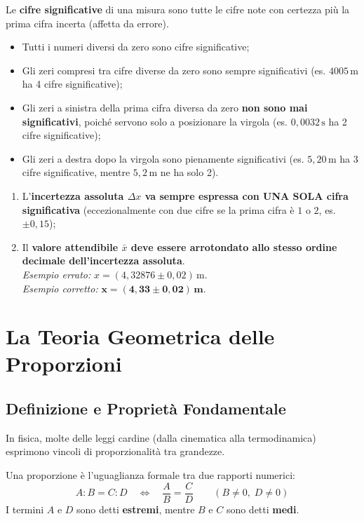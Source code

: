 \documentclass[11pt,a4paper,oneside]{report}
\begin{document}
\begin{definizione}
Le \textbf{cifre significative} di una misura sono tutte le cifre note con certezza più la prima cifra incerta (affetta da errore).
\begin{itemize}
  \item Tutti i numeri diversi da zero sono cifre significative;
  \item Gli zeri compresi tra cifre diverse da zero sono sempre significativi (es. $4005\,\text{m}$ ha 4 cifre significative);
  \item Gli zeri a sinistra della prima cifra diversa da zero \textbf{non sono mai significativi}, poiché servono solo a posizionare la virgola (es. $0{,}0032\,\text{s}$ ha 2 cifre significative);
  \item Gli zeri a destra dopo la virgola sono pienamente significativi (es. $5{,}20\,\text{m}$ ha 3 cifre significative, mentre $5{,}2\,\text{m}$ ne ha solo 2).
\end{itemize}
\end{definizione}

\begin{avviso}
\begin{enumerate}
  \item L'\textbf{incertezza assoluta $\Delta x$ va sempre espressa con UNA SOLA cifra significativa} (eccezionalmente con due cifre se la prima cifra è $1$ o $2$, es. $\pm 0{,}15$);
  \item Il \textbf{valore attendibile $\bar{x}$ deve essere arrotondato allo stesso ordine decimale dell'incertezza assoluta}.\\
  \textit{Esempio errato:} $x = (4{,}32876 \pm 0{,}02)\,\text{m}$.\\
  \textit{Esempio corretto:} $\mathbf{x = (4{,}33 \pm 0{,}02)\,\text{m}}$.
\end{enumerate}
\end{avviso}

\chapter{La Teoria Geometrica delle Proporzioni}

\section{Definizione e Proprietà Fondamentale}
In fisica, molte delle leggi cardine (dalla cinematica alla termodinamica) esprimono vincoli di proporzionalità tra grandezze.
\begin{definizione}
Una proporzione è l'uguaglianza formale tra due rapporti numerici:
\[
A : B = C : D \quad \Longleftrightarrow \quad \frac{A}{B} = \frac{C}{D} \qquad (B \neq 0, \; D \neq 0)
\]
I termini $A$ e $D$ sono detti \textbf{estremi}, mentre $B$ e $C$ sono detti \textbf{medi}.
\end{definizione}
\end{document}

